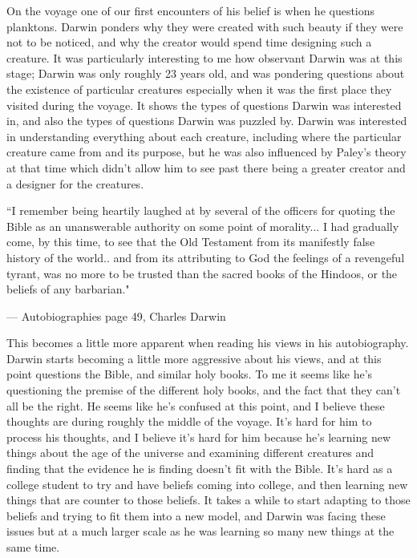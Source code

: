 \documentclass[11pt, oneside]{article}
\begin{document}
\par On the voyage one of our first encounters of his belief is when he questions planktons. Darwin ponders why they were created with such beauty if they were not to be noticed, and why the creator would spend time designing such a creature. It was particularly interesting to me how observant Darwin was at this stage; Darwin was only roughly 23 years old, and was pondering questions about the existence of particular creatures especially when it was the first place they visited during the voyage. It shows the types of questions Darwin was interested in, and also the types of questions Darwin was puzzled by. Darwin was interested in understanding everything about each creature, including where the particular creature came from and its purpose, but he was also influenced by Paley's theory at that time which didn't allow him to see past there being a greater creator and a designer for the creatures.

\epigraph{``I remember being heartily laughed at by several of the officers for quoting the Bible as an unanswerable authority on some point of morality... I had gradually come, by this time, to see that the Old Testament from its manifestly false history of the world.. and from its attributing to God the feelings of a revengeful tyrant, was no more to be trusted than the sacred books of the Hindoos, or the beliefs of any barbarian."}{--- \textup{Autobiographies page 49, Charles Darwin}}

\par This becomes a little more apparent when reading his views in his autobiography. Darwin starts becoming a little more aggressive about his views, and at this point questions the Bible, and similar holy books. To me it seems like he's questioning the premise of the different holy books, and the fact that they can't all be the right. He seems like he's confused at this point, and I believe these thoughts are during roughly the middle of the voyage. It's hard for him to process his thoughts, and I believe it's hard for him because he's learning new things about the age of the universe and examining different creatures and finding that the evidence he is finding doesn't fit with the Bible. It's hard as a college student to try and have beliefs coming into college, and then learning new things that are counter to those beliefs. It takes a while to start adapting to those beliefs and trying to fit them into a new model, and Darwin was facing these issues but at a much larger scale as he was learning so many new things at the same time. 
\end{document}
